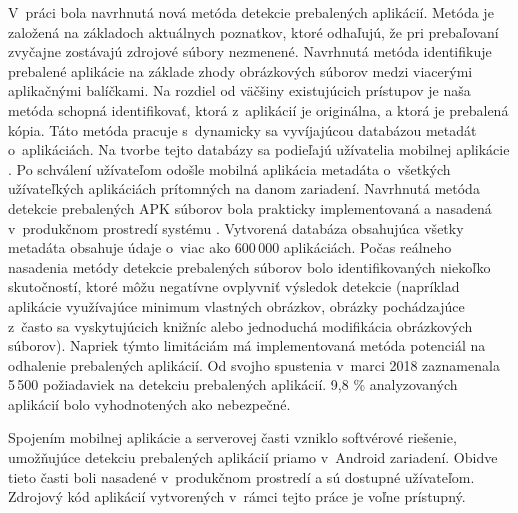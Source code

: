 V~práci bola navrhnutá nová metóda detekcie prebalených aplikácií. Metóda je založená na základoch aktuálnych poznatkov, ktoré odhaľujú, že pri prebaľovaní zvyčajne zostávajú zdrojové súbory nezmenené. Navrhnutá metóda identifikuje prebalené aplikácie na základe zhody obrázkových súborov medzi viacerými aplikačnými balíčkami. Na rozdiel od väčšiny existujúcich prístupov je naša metóda schopná identifikovať, ktorá z~aplikácií je originálna, a ktorá je prebalená kópia. Táto metóda pracuje s~dynamicky sa vyvíjajúcou databázou metadát o~aplikáciách. Na tvorbe tejto databázy sa podieľajú užívatelia mobilnej aplikácie . Po schválení užívateľom odošle mobilná aplikácia metadáta o~všetkých užívateľkých aplikáciách prítomných na danom zariadení. Navrhnutá metóda detekcie prebalených APK súborov bola prakticky implementovaná a nasadená v~produkčnom prostredí systému .
Vytvorená databáza obsahujúca všetky metadáta obsahuje údaje o~viac ako 600\,000 aplikáciách. Počas reálneho nasadenia metódy detekcie prebalených súborov bolo identifikovaných niekoľko skutočností, ktoré môžu negatívne ovplyvniť výsledok detekcie (napríklad aplikácie využívajúce minimum vlastných obrázkov, obrázky pochádzajúce z~často sa vyskytujúcich knižníc alebo jednoduchá modifikácia obrázkových súborov). Napriek týmto limitáciám má implementovaná metóda potenciál na odhalenie prebalených aplikácií. Od svojho spustenia v~marci 2018 zaznamenala 5\,500 požiadaviek na detekciu prebalených aplikácií. 9,8 \% analyzovaných aplikácií bolo vyhodnotených ako nebezpečné.

Spojením mobilnej aplikácie a serverovej časti vzniklo softvérové riešenie, umožňujúce detekciu prebalených aplikácií priamo v~Android zariadení. Obidve tieto časti boli nasadené v~produkčnom prostredí a sú dostupné užívateľom. Zdrojový kód aplikácií vytvorených v~rámci tejto práce je voľne prístupný.
